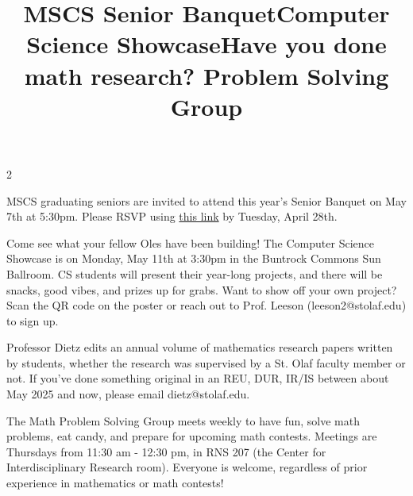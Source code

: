 \documentclass[12pt]{article}
\newcommand{\bolder}{\textbf}
\begin{document}
\begin{multicols}{2}
\begin{tcolorbox}[colback=white, colframe=black]
    \begin{center}
    \title{{\large \bolder{MSCS Senior Banquet}}}
    \end{center}
\end{tcolorbox}

MSCS graduating seniors are invited to attend this year's Senior Banquet on May 7th at 5:30pm. Please RSVP using \href{https://docs.google.com/forms/d/e/1FAIpQLScgOKI8CBUjdAlBOWogwo_QmVcTVVHmFHDOw5-bzeL7vT30CQ/viewform}{this link} by Tuesday, April 28th. 

\begin{tcolorbox}[colback=white, colframe=black]
    \begin{center}
    \title{{\large \bolder{Computer Science Showcase}}}
    \end{center}
\end{tcolorbox}

Come see what your fellow Oles have been building! The Computer Science Showcase is on Monday, May 11th at 3:30pm in the Buntrock Commons Sun Ballroom. CS students will present their year-long projects, and there will be snacks, good vibes, and prizes up for grabs. Want to show off your own project? Scan the QR code on the poster or reach out to Prof. Leeson (leeson2@stolaf.edu) to sign up.

\begin{tcolorbox}[colback=white, colframe=black]
    \begin{center}
    \title{{\large \bolder{Have you done math research?
    }}}
    \end{center}
\end{tcolorbox}
Professor Dietz edits an annual volume of mathematics research papers written by students, whether the research was supervised by a St. Olaf faculty member or not. If you've done something original in an REU, DUR, IR/IS between about May 2025 and now, please email dietz@stolaf.edu. 

\begin{tcolorbox}[colback=white, colframe=black]
    \begin{center}
    \title{{\large \bolder{Problem Solving Group}}}
    \end{center}
\end{tcolorbox}
The Math Problem Solving Group meets weekly to have fun, solve math problems, eat candy, and prepare for upcoming math contests. Meetings are Thursdays from 11:30 am - 12:30 pm, in RNS 207 (the Center for Interdisciplinary Research room). Everyone is welcome, regardless of prior experience in mathematics or math contests!


\end{multicols} \vspace{3cm} 
\end{document}
